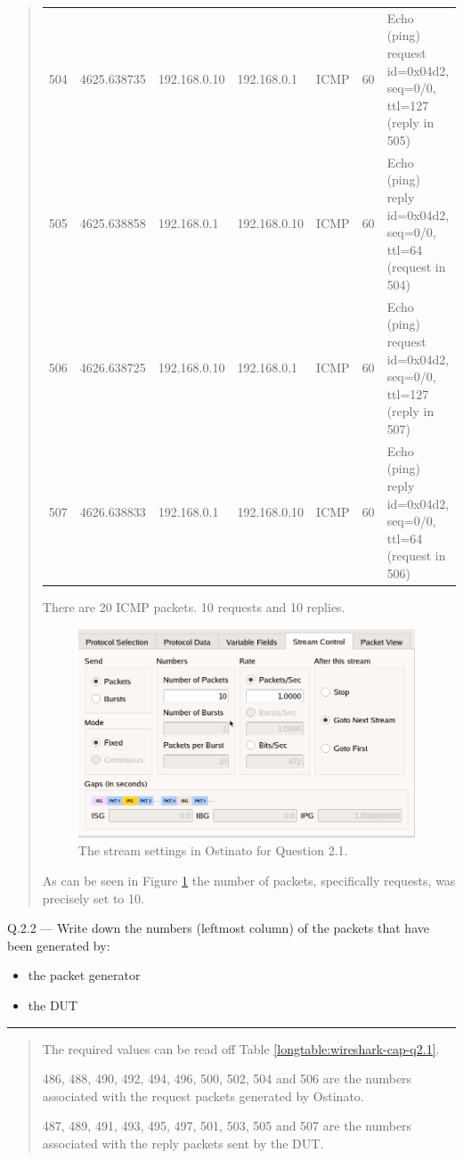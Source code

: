 \documentclass{article}
\newcommand\Que[2]{%
   \begin{samepage}
   \leavevmode\par
   \noindent
   Q.#1 --- #2\par\vspace{10pt}\hrule\vspace{10pt}
   \end{samepage}}
\newenvironment{ans}
   {\fbox{Answer}\begin{quote}\nopagebreak}
   {\end{quote}}
\newcommand\INFOCOLSIZE{13em}
\begin{document}
\begin{ans}
\begin{center}
\begin{longtable}{|l|l|l|l|l|l|p{\INFOCOLSIZE}|}
504 & 4625.638735 & 192.168.0.10 & 192.168.0.1 & ICMP & 60 & Echo (ping)
request id=0x04d2, seq=0/0, ttl=127 (reply in 505) \\
505 & 4625.638858 & 192.168.0.1 & 192.168.0.10 & ICMP & 60 & Echo (ping)
reply id=0x04d2, seq=0/0, ttl=64 (request in 504) \\
506 & 4626.638725 & 192.168.0.10 & 192.168.0.1 & ICMP & 60 & Echo (ping)
request id=0x04d2, seq=0/0, ttl=127 (reply in 507) \\
507 & 4626.638833 & 192.168.0.1 & 192.168.0.10 & ICMP & 60 & Echo (ping)
reply id=0x04d2, seq=0/0, ttl=64 (request in 506) \\
\end{longtable}
\end{center}

There are 20 ICMP packets. 10 requests and 10 replies.

\begin{figure}[H]
   \centering
   \includegraphics[width=10cm]{data/q2.1-stream-settings.png}
   \caption{The stream settings in Ostinato for Question 2.1.}
   \label{fig:stream-settings-q2.1}
\end{figure}

As can be seen in Figure \ref{fig:stream-settings-q2.1} the
number of packets, specifically requests, was precisely set to
10.

\end{ans}

\newpage

\Que{2.2}{Write down the numbers (leftmost column) of the packets that have been generated by:
\begin{itemize}
\item the packet generator
\item the DUT
\end{itemize}
}

\begin{ans}
The required values can be read off Table
\ref{longtable:wireshark-cap-q2.1}.

486, 488, 490, 492, 494, 496, 500, 502, 504 and 506 are the
numbers associated with the request packets generated by
Ostinato.

487, 489, 491, 493, 495, 497, 501, 503, 505 and 507 are the
numbers associated with the reply packets sent by the DUT.
\end{ans}
\end{document}
